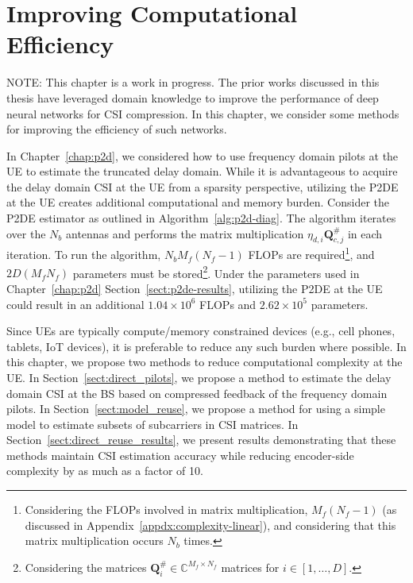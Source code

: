 \chapter{Improving Computational Efficiency} \label{chap:comp-effic}

{\color{red} NOTE: This chapter is a work in progress.} The prior works discussed in this thesis have leveraged domain knowledge to improve the performance of deep neural networks for CSI compression. In this chapter, we consider some methods for improving the efficiency of such networks.

In Chapter~\ref{chap:p2d}, we considered how to use frequency domain pilots at the UE to estimate the truncated delay domain. While it is advantageous to acquire the delay domain CSI at the UE from a sparsity perspective, utilizing the P2DE at the UE creates additional computational and memory burden. Consider the P2DE estimator as outlined in Algorithm~\ref{alg:p2d-diag}. The algorithm iterates over the $N_b$ antennas and performs the matrix multiplication $\eta_{d,i}\mathbf{Q}_{c,j}^{\#}$ in each iteration. To run the algorithm, $N_bM_f(N_f-1)$ FLOPs are required\footnote{Considering the FLOPs involved in matrix multiplication, $M_f(N_f-1)$ (as discussed in Appendix~\ref{appdx:complexity-linear}), and considering that this matrix multiplication occurs $N_b$ times.}, and $2D(M_fN_f)$ parameters must be stored\footnote{Considering the matrices $\mathbf{Q}_i^{\#} \in \mathbb{C}^{M_f \times N_f}$ matrices for $i \in [1, \dots, D]$.}. Under the parameters used in Chapter~\ref{chap:p2d} Section~\ref{sect:p2de-results}, utilizing the P2DE at the UE could result in an additional $1.04\times 10^{6}$ FLOPs and $2.62\times 10^{5}$ parameters. %

Since UEs are typically compute/memory constrained devices (e.g., cell phones, tablets, IoT devices), it is preferable to reduce any such burden where possible. In this chapter, we propose two methods to reduce computational complexity at the UE. In Section~\ref{sect:direct_pilots}, we propose a method to estimate the delay domain CSI at the BS based on compressed feedback of the frequency domain pilots. In Section~\ref{sect:model_reuse}, we propose a method for using a simple model to estimate subsets of subcarriers in CSI matrices. In Section~\ref{sect:direct_reuse_results}, we present results demonstrating that these methods maintain CSI estimation accuracy while reducing encoder-side complexity by as much as a factor of 10. 


